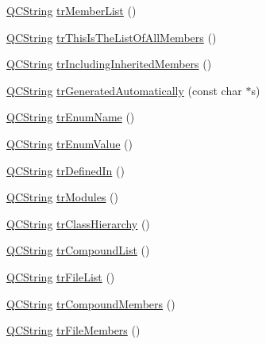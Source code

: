 \begin{DoxyCompactItemize}
\mbox{\hyperlink{class_q_c_string}{Q\+C\+String}} \mbox{\hyperlink{class_translator_portuguese_a9e312975f07b5366f88c047566803667}{tr\+Member\+List}} ()
\item 
\mbox{\hyperlink{class_q_c_string}{Q\+C\+String}} \mbox{\hyperlink{class_translator_portuguese_a7a533c992336185a6513bbdd8217c202}{tr\+This\+Is\+The\+List\+Of\+All\+Members}} ()
\item 
\mbox{\hyperlink{class_q_c_string}{Q\+C\+String}} \mbox{\hyperlink{class_translator_portuguese_ad018c47a11432b7f0e47ca71c8038e8a}{tr\+Including\+Inherited\+Members}} ()
\item 
\mbox{\hyperlink{class_q_c_string}{Q\+C\+String}} \mbox{\hyperlink{class_translator_portuguese_a137ac3f645931de02e3640d6add622d8}{tr\+Generated\+Automatically}} (const char $\ast$s)
\item 
\mbox{\hyperlink{class_q_c_string}{Q\+C\+String}} \mbox{\hyperlink{class_translator_portuguese_aa721544b038b09d360ab1819aab791b5}{tr\+Enum\+Name}} ()
\item 
\mbox{\hyperlink{class_q_c_string}{Q\+C\+String}} \mbox{\hyperlink{class_translator_portuguese_a003f65dcb1899d8fa0a7904ea7d1ff45}{tr\+Enum\+Value}} ()
\item 
\mbox{\hyperlink{class_q_c_string}{Q\+C\+String}} \mbox{\hyperlink{class_translator_portuguese_a4b6b01518bccb0fd6b84d03725a4d03f}{tr\+Defined\+In}} ()
\item 
\mbox{\hyperlink{class_q_c_string}{Q\+C\+String}} \mbox{\hyperlink{class_translator_portuguese_aadb9b678ff79400eb586395e197d9359}{tr\+Modules}} ()
\item 
\mbox{\hyperlink{class_q_c_string}{Q\+C\+String}} \mbox{\hyperlink{class_translator_portuguese_a0e1c63c2d19a6b57fafd403dc92a1cf2}{tr\+Class\+Hierarchy}} ()
\item 
\mbox{\hyperlink{class_q_c_string}{Q\+C\+String}} \mbox{\hyperlink{class_translator_portuguese_aec0cb57861d23dbd1195c54468ceaf64}{tr\+Compound\+List}} ()
\item 
\mbox{\hyperlink{class_q_c_string}{Q\+C\+String}} \mbox{\hyperlink{class_translator_portuguese_a8479befda6e2ce5364297dda6d328e2e}{tr\+File\+List}} ()
\item 
\mbox{\hyperlink{class_q_c_string}{Q\+C\+String}} \mbox{\hyperlink{class_translator_portuguese_a2b87e8d349a1ee07c93f6333b340874f}{tr\+Compound\+Members}} ()
\item 
\mbox{\hyperlink{class_q_c_string}{Q\+C\+String}} \mbox{\hyperlink{class_translator_portuguese_a96b28ed4a548d62f9350b576b5dba05f}{tr\+File\+Members}} ()

\end{DoxyCompactItemize}
